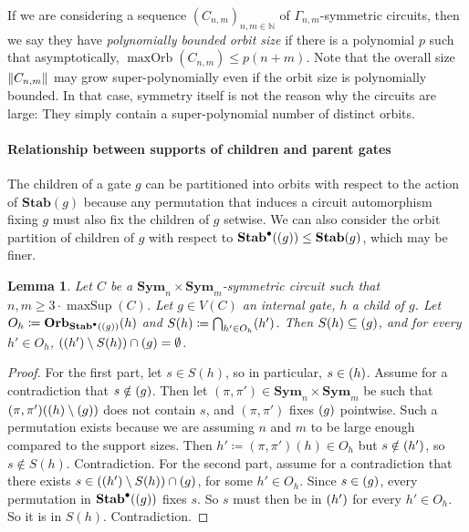 \documentclass[10pt,a4paper]{article}
\theoremstyle{definition}
\theoremstyle{plain}
\newtheorem{lemma}[definition]{Lemma}
\theoremstyle{remark}
\DeclarePairedDelimiter{\norm}{\lVert}{\rVert}
\newcommand{\Sym}{\mathbf{Sym}}
\newcommand{\Stab}{\mathbf{Stab}}
\newcommand{\StabP}{\Stab^{\bullet}}
\newcommand{\Orb}{\mathbf{Orb}}
\newcommand{\bbN}{\mathbb{N}}
\let\sup\relax
\DeclareMathOperator{\sup}{sup}
\DeclareMathOperator{\maxOrb}{maxOrb}
\DeclareMathOperator{\maxSup}{maxSup}
\begin{document}
If we are considering a sequence $(C_{n,m})_{n,m \in \bbN}$ of $\Gamma_{n,m}$-symmetric circuits, then we say they have \emph{polynomially bounded orbit size} if there is a polynomial $p$ such that asymptotically, $\maxOrb(C_{n,m}) \leq p(n+m)$. Note that the overall size $\norm{C_{n,m}}$ may grow super-polynomially even if the orbit size is polynomially bounded. In that case, symmetry itself is not the reason why the circuits are large: They simply contain a super-polynomial number of distinct orbits.



\paragraph*{Relationship between supports of children and parent gates}

The children of a gate $g$ can be partitioned into orbits with respect to the action of $\Stab(g)$ because any permutation that induces a circuit automorphism fixing $g$ must also fix the children of $g$ setwise. We can also consider the orbit partition of children of $g$ with respect to $\StabP(\sup(g)) \leq \Stab(g)$, which may be finer. 
\begin{lemma}
\label{lem:intersectionOfChildSupports}
Let $C$ be a $\Sym_n \times \Sym_m$-symmetric circuit such that $n,m \geq 3 \cdot \maxSup(C)$. 
Let $g \in V(C)$ an internal gate, $h$ a child of $g$.
Let $O_h \coloneqq \Orb_{\StabP(\sup(g))}(h)$ and $S(h) \coloneqq \bigcap_{h' \in O_h} \sup(h')$.
Then $S(h) \subseteq \sup(g)$, and for every $h' \in O_h$, $(\sup(h') \setminus S(h)) \cap \sup(g) = \emptyset$. 
\end{lemma}	
\begin{proof}
For the first part, let $s \in S(h)$, so in particular, $s \in \sup(h)$. Assume for a contradiction that $s \notin \sup(g)$. Then let $(\pi, \pi') \in \Sym_n \times \Sym_m$ be such that $(\pi, \pi')(\sup(h) \setminus \sup(g))$ does not contain $s$, and $(\pi, \pi')$ fixes $\sup(g)$ pointwise. Such a permutation exists because we are assuming $n$ and $m$ to be large enough compared to the support sizes. Then $h' \coloneqq (\pi, \pi')(h) \in O_h$ but $s \notin \sup(h')$, so $s \notin S(h)$. Contradiction.
For the second part, assume for a contradiction that there exists $s \in (\sup(h') \setminus S(h)) \cap \sup(g)$, for some $h' \in O_h$. Since $s \in \sup(g)$, every permutation in $\StabP(\sup(g))$ fixes $s$. So $s$ must then be in $\sup(h')$ for every $h' \in O_h$. So it is in $S(h)$. Contradiction.	
\end{proof}	
\end{document}
